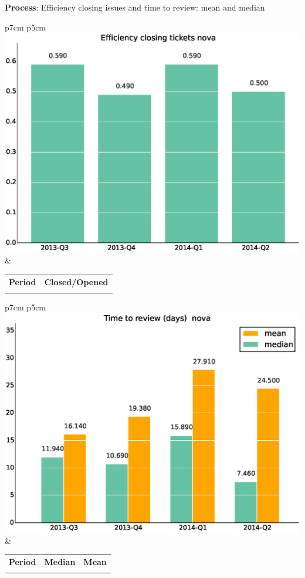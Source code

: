 \documentclass[a4wide,11pt]{report}
\begin{document}
\textbf{Process}: Efficiency closing issues and time to review: mean and median

\begin{tabular}{p{7cm} p{5cm}}
    \vspace{0pt} 
    \includegraphics[scale=.35]{figs/bminova.eps}
    & 
    \vspace{0pt}
    \begin{tabular}{l|l}%
    \bfseries Period & \bfseries Closed/Opened %
    \csvreader[head to column names]{data/bminova.csv}{}%
    {\\ & \bmi}
    \end{tabular}
\end{tabular}

\begin{tabular}{p{7cm} p{5cm}}
    \vspace{0pt} 
    \includegraphics[scale=.35]{figs/timetoreview_mediannova.eps}
    & 
    \vspace{0pt}
    \begin{tabular}{l|r|r|}%
    \bfseries Period & \bfseries Median & \bfseries Mean %
    \csvreader[head to column names]{data/timetoreview_mediannova.csv}{}%
    {\\ & \mediantime & \meantime}
    \end{tabular}
\end{tabular}
\end{document}
